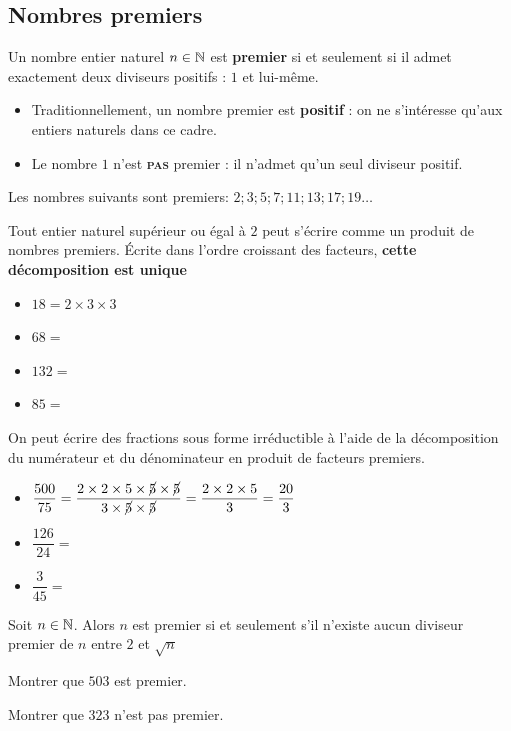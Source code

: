\documentclass{poly}
\begin{document}
\subsection{Nombres premiers}
\begin{definition}
Un nombre entier naturel $n \in \mathbb{N}$ est \textbf{premier} si et seulement si il admet exactement deux diviseurs positifs : $1$ et lui-même. 
\end{definition}
\begin{remark}
\hfill
\begin{itemize}
\item Traditionnellement, un nombre premier est \textbf{positif} : on ne s'intéresse qu'aux entiers naturels dans ce cadre.
\item Le nombre $1$ n'est \textbf{\textsc{pas}} premier : il n'admet qu'un seul diviseur positif. 
\end{itemize}
\end{remark}
\begin{example}
Les nombres suivants sont premiers: $2; 3; 5; 7; 11; 13; 17; 19 \dots$
\end{example}
\begin{theorem}
Tout entier naturel supérieur ou égal à $2$ peut s'écrire comme un produit de nombres premiers. Écrite dans l'ordre croissant des facteurs, \textbf{cette décomposition est unique}
\end{theorem}
\begin{example}
\hfill
\begin{itemize}
\item $18 = 2 \times 3 \times 3$
\item $68 =$  
\item $132 =$ 
\item $85 =$ 
\end{itemize}
\end{example}
\begin{example}
On peut écrire des fractions sous forme irréductible à l'aide de la décomposition du numérateur et du dénominateur en produit de facteurs premiers.
\begin{itemize}
\item $\dfrac{500}{75} = \dfrac{2 \times 2 \times 5 \times \cancel{5} \times \cancel{5}}{3 \times \cancel{5} \times \cancel{5}} = \dfrac{2 \times 2 \times 5}{3} = \dfrac{20}{3}$
\item $\dfrac{126}{24} =$ 
\item $\dfrac{3}{45} =$ 
\end{itemize}
\end{example}
\begin{proposition}
Soit $n \in \mathbb{N}$. Alors $n$ est premier si et seulement s'il n'existe aucun diviseur premier de $n$ entre $2$ et $\sqrt{n}$ 
\end{proposition}
\begin{exercize}
\hfill
\begin{alphaquestions}
\item Montrer que $503$ est premier.
\item Montrer que $323$ n'est pas premier.
\end{alphaquestions}
\end{exercize}
\end{document}
